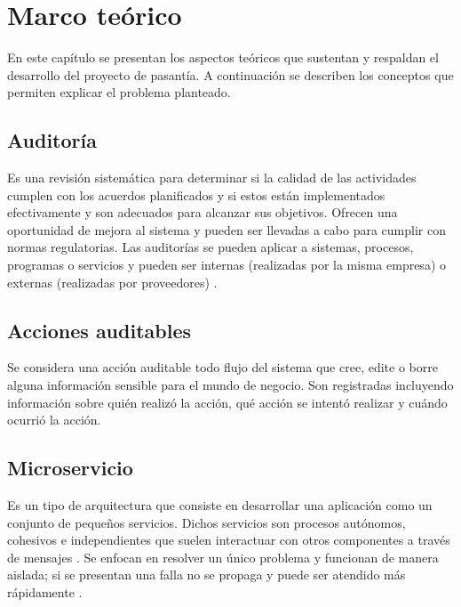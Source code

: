 \chapter{\textbf{Marco teórico}}

\thispagestyle{empty}

En este capítulo se presentan los aspectos teóricos que sustentan y respaldan el desarrollo del proyecto de pasantía. A continuación se describen los conceptos que permiten explicar el problema planteado.

\section{Auditoría}

Es una revisión sistemática para determinar si la calidad de las actividades cumplen con los acuerdos planificados y si estos están implementados efectivamente y son adecuados para alcanzar sus objetivos. Ofrecen una oportunidad de mejora al sistema y pueden ser llevadas a cabo para cumplir con normas regulatorias. Las auditorías se pueden aplicar a sistemas, procesos, programas o servicios y pueden ser internas (realizadas por la misma empresa) o externas (realizadas por proveedores) \cite{weinstein1997total}.

\section{Acciones auditables}

Se considera una acción auditable todo flujo del sistema que cree, edite o borre alguna información sensible para el mundo de negocio. Son registradas incluyendo información sobre quién realizó la acción, qué acción se intentó realizar y cuándo ocurrió la acción.

\section{Microservicio}

Es un tipo de arquitectura que consiste en desarrollar una aplicación como un conjunto de pequeños servicios. Dichos servicios son procesos autónomos, cohesivos e independientes que suelen interactuar con otros componentes a través de mensajes \cite{Microservices1}. Se enfocan en resolver un único problema y funcionan de manera aislada; si se presentan una falla no se propaga y puede ser atendido más rápidamente \cite{Microservices2}. \\

